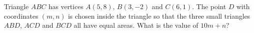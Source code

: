Triangle $ABC$ has vertices $A(5,8)$, $B(3,-2)$ and $C(6,1)$. The point $D$ with coordinates $(m,n)$ is chosen inside the triangle so that the three small triangles $ABD$, $ACD$ and $BCD$ all have equal areas. What is the value of $10m+n$?
